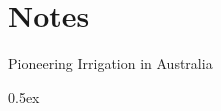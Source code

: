 
\chapter{Notes}
\label{ch:notes}
%
{Pioneering Irrigation in Australia}

\begingroup
\parindent 0pt
\parskip   0.5ex
\renewcommand{\enotesize}{\small}
\theendnotes
\endgroup
